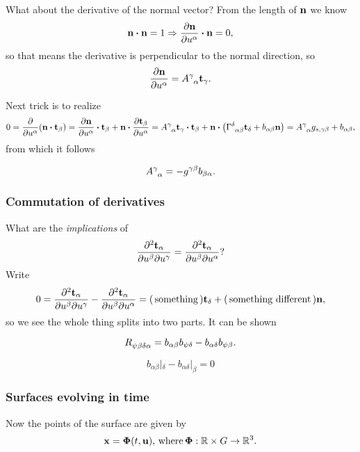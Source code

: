 \documentclass[reqno, a4paper]{article}
\begin{document}
What about the derivative of the normal vector? From the length of $\vb{n}$ we know
\[
	\vb{n}\vdot \vb{n} = 1 \Rightarrow \pdv{\vb{n}}{u^{\alpha}}\vdot \vb{n} = 0,
\]
so that means the derivative is perpendicular to the normal direction, so
\[
	\pdv{\vb{n}}{u^\alpha}= A \indices{^\gamma_{\alpha}} \vb{t}_{\gamma}.
\]

Next trick is to realize
\[
	0 = \pdv{u^{\alpha}}\qty(\vb{n}\vdot \vb{t}_{\beta}) = \pdv{\vb{n}}{u^{\alpha}} \vdot \vb{t}_{\beta}+ \vb{n}\vdot \pdv{\vb{t}_{\beta}}{u^{\alpha}} = A \indices{^{\gamma}_{\alpha}}\vb{t}_{\gamma} \vdot \vb{t}_{\beta}+ \vb{n}\vdot \qty(\Gamma \indices{^{\delta}_{\alpha \beta}} \vb{t}_{\delta}+b_{\alpha \beta} \vb{n}) = A \indices{^\gamma _{\alpha}} g_{s, \gamma \beta}+ b_{\alpha \beta},
\]
from which it follows

\[
	A \indices{^{\gamma}_{\alpha}} = -g \indices{^{\gamma \beta}}b_{\beta \alpha}.
\]

\subsubsection{Commutation of derivatives}
\label{sec:com_der}

What are the \textit{implications} of
\[
	\pdv[2]{\vb{t}_{\alpha}}{u^{\beta}}{u^{\gamma}} = \pdv[2]{\vb{t}_{\alpha}}{u^{\beta}}{u^{\alpha}}?
	\]
Write
\[
	0 = \pdv[2]{\vb{t}_{\alpha}}{u^{\beta}}{u^{\gamma}} - \pdv[2]{\vb{t}_{\alpha}}{u^{\beta}}{u^{\alpha}} = (\, \text{something} \,) \vb{t}_{\delta}+(\, \text{something different} \,) \vb{n},
\]
so we see the whole thing splits into two parts. It can be shown
\begin{theorem}
	\[
		R \indices{_{\psi \beta \delta \alpha}} = b_{\alpha \beta}b_{\psi \delta} - b_{\alpha \delta} b_{\psi \beta}.
	\]
\end{theorem}

\begin{theorem}
	\[
		b_{\alpha \beta}|_{\delta}- b_{\alpha \delta}|_{\beta}=0
	\]
\end{theorem}

\subsubsection{Surfaces evolving in time}
\label{sec:time_evolving_surfaces}

Now the points of the surface are given by
\[
	\vb{x}=\vb*{\Phi}\qty(t,\vb{u}), \, \text{where} \,\vb*{\Phi}: {\mathbb R} \times G \to {\mathbb R}^3.
\]
\end{document}
